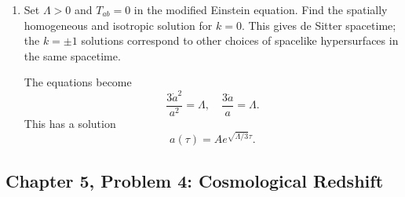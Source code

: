 \begin{enumerate}[label=\alph*)]
    \item Set $\Lambda>0$ and $T_{ab}=0$ in the modified Einstein equation.
    Find the spatially homogeneous and isotropic solution for $k=0$. This gives
    de Sitter spacetime; the $k=\pm1$ solutions correspond to other choices of
    spacelike hypersurfaces in the same spacetime.
    \begin{solution}
        The equations become
        \begin{equation}
            \frac{3\dot a^2}{a^2} = \Lambda,\quad \frac{3\ddot a}{a} = \Lambda.
        \end{equation}
        This has a solution
        \begin{equation}
            a(\tau) = Ae^{\sqrt{\Lambda/3}\tau}.
        \end{equation}
    \end{solution}
\end{enumerate}

\subsection{Chapter 5, Problem 4: Cosmological Redshift}

